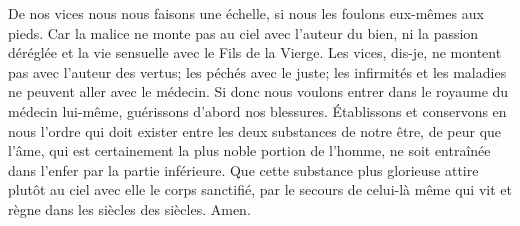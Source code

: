 De nos vices nous nous faisons une échelle,
	si nous les foulons eux-mêmes aux pieds.
Car la malice ne monte pas au ciel avec l’auteur du bien,
	ni la passion déréglée et la vie sensuelle avec le Fils de la Vierge.
Les vices, dis-je, ne montent pas avec l’auteur des vertus;
	les péchés avec le juste;
	les infirmités et les maladies ne peuvent aller avec le médecin.
Si donc nous voulons entrer dans le royaume du médecin lui-même,
	guérissons d’abord nos blessures.
Établissons et conservons en nous
	l’ordre qui doit exister entre les deux substances de notre être,
	de peur que l’âme, qui est certainement la plus noble portion de l’homme,
	ne soit entraînée dans l’enfer par la partie inférieure.
Que cette substance plus glorieuse
		attire plutôt au ciel avec elle le corps sanctifié,
	par le secours de celui-là même
		qui vit et règne dans les siècles des siècles. Amen.
